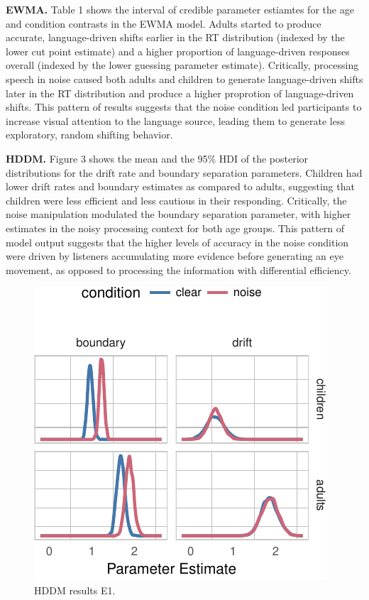 \documentclass[10pt, letterpaper]{article}
\newenvironment{CodeChunk}{}{}
\begin{document}
\textbf{EWMA.} Table 1 shows the interval of credible parameter
estiamtes for the age and condition contrasts in the EWMA model. Adults
started to produce accurate, language-driven shifts earlier in the RT
distribution (indexed by the lower cut point estimate) and a higher
proportion of language-driven responses overall (indexed by the lower
guessing parameter estimate). Critically, processing speech in noise
caused both adults and children to generate language-driven shifts later
in the RT distribution and produce a higher proprotion of
language-driven shifts. This pattern of results suggests that the noise
condition led participants to increase visual attention to the language
source, leading them to generate less exploratory, random shifting
behavior.

\textbf{HDDM.} Figure 3 shows the mean and the 95\% HDI of the posterior
distributions for the drift rate and boundary separation parameters.
Children had lower drift rates and boundary estimates as compared to
adults, suggesting that children were less efficient and less cautious
in their responding. Critically, the noise manipulation modulated the
boundary separation parameter, with higher estimates in the noisy
processing context for both age groups. This pattern of model output
suggests that the higher levels of accuracy in the noise condition were
driven by listeners accumulating more evidence before generating an eye
movement, as opposed to processing the information with differential
efficiency.

\begin{CodeChunk}
\begin{figure}[t]

{\centering \includegraphics[width=0.85\linewidth]{figs/hddm_plot_noise-1} 

}

\caption[HDDM results E1]{HDDM results E1.}\label{fig:hddm_plot_noise}
\end{figure}
\end{CodeChunk}
\end{document}
